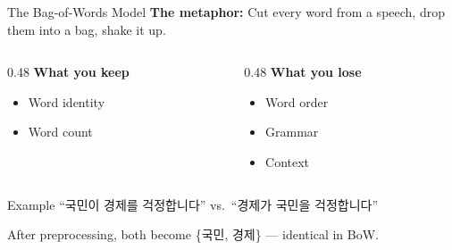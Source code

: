 \documentclass[aspectratio=169,11pt]{beamer}
\begin{document}
\begin{frame}{The Bag-of-Words Model}
    \textbf{The metaphor:} Cut every word from a speech, drop them into a bag, shake it up.

    \vspace{0.3cm}

    \begin{columns}[T]
        \begin{column}{0.48\textwidth}
            \textbf{What you keep}
            \begin{itemize}
                \item Word identity
                \item Word count
            \end{itemize}
        \end{column}
        \begin{column}{0.48\textwidth}
            \textbf{What you lose}
            \begin{itemize}
                \item Word order
                \item Grammar
                \item Context
            \end{itemize}
        \end{column}
    \end{columns}

    \vspace{0.4cm}

    \begin{exampleblock}{Example}
        ``국민이 경제를 걱정합니다'' vs.\ ``경제가 국민을 걱정합니다''

        \vspace{0.15cm}
        After preprocessing, both become \{국민, 경제\} --- identical in BoW.
    \end{exampleblock}
\end{frame}
\end{document}
